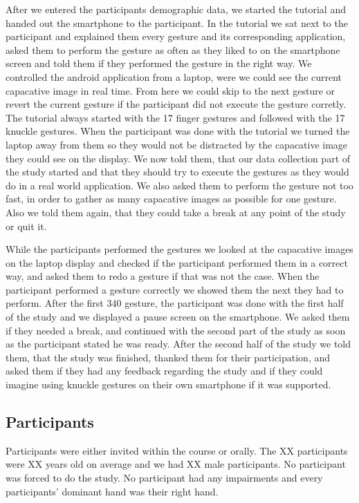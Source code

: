 \documentclass[sigchi-a, authorversion]{acmart}
\begin{document}
After we entered the participants demographic data, we started the tutorial and handed out the smartphone to the participant.
In the tutorial we sat next to the participant and explained them every gesture and its corresponding application, asked them to perform the gesture as often as they liked to on the smartphone screen and told them if they performed the gesture in the right way.
We controlled the android application from a laptop, were we could see the current capacative image in real time.
From here we could skip to the next gesture or revert the current gesture if the participant did not execute the gesture corretly.
The tutorial always started with the 17 finger gestures and followed with the 17 knuckle gestures.
When the participant was done with the tutorial we turned the laptop away from them so they would not be distracted by the capacative image they could see on the display. 
We now told them, that our data collection part of the study started and that they should try to execute the gestures as they would do in a real world application.
We also asked them to perform the gesture not too fast, in order to gather as many capacative images as possible for one gesture.
Also we told them again, that they could take a break at any point of the study or quit it.

While the participants performed the gestures we looked at the capacative images on the laptop display and checked if the participant performed them in a correct way, and asked them to redo a gesture if that was not the case.
When the participant performed a gesture correctly we showed them the next they had to perform.
After the first 340 gesture, the participant was done with the first half of the study and we displayed a pause screen on the smartphone.
We asked them if they needed a break, and continued with the second part of the study as soon as the participant stated he was ready.
After the second half of the study we told them, that the study was finished, thanked them for their participation, and asked them if they had any feedback regarding the study and if they could imagine using knuckle gestures on their own smartphone if it was supported.

\subsection{Participants}
Participants were either invited within the course or orally.
The XX participants were XX years old on average and we had XX male participants.
No participant was forced to do the study.
No participant had any impairments and every participants' dominant hand was their right hand. 
\end{document}
